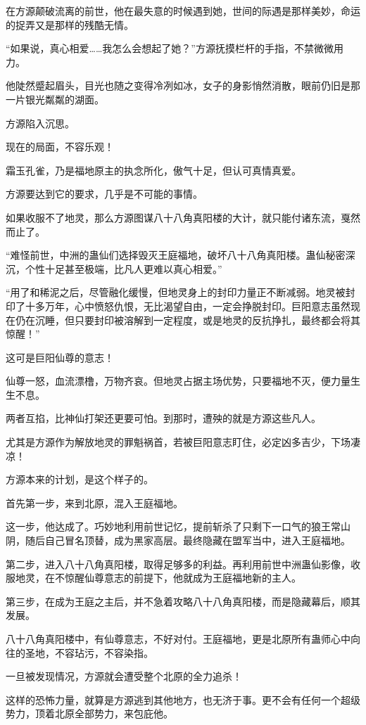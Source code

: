 \begin{this_body}
在方源颠破流离的前世，他在最失意的时候遇到她，世间的际遇是那样美妙，命运的捉弄又是那样的残酷无情。

“如果说，真心相爱……我怎么会想起了她？”方源抚摸栏杆的手指，不禁微微用力。

他陡然蹙起眉头，目光也随之变得冷冽如冰，女子的身影悄然消散，眼前仍旧是那一片银光粼粼的湖面。

方源陷入沉思。

现在的局面，不容乐观！

霜玉孔雀，乃是福地原主的执念所化，傲气十足，但认可真情真爱。

方源要达到它的要求，几乎是不可能的事情。

如果收服不了地灵，那么方源图谋八十八角真阳楼的大计，就只能付诸东流，戛然而止了。

“难怪前世，中洲的蛊仙们选择毁灭王庭福地，破坏八十八角真阳楼。蛊仙秘密深沉，个性十足甚至极端，比凡人更难以真心相爱。”

“用了和稀泥之后，尽管融化缓慢，但地灵身上的封印力量正不断减弱。地灵被封印了十多万年，心中愤怒仇恨，无比渴望自由，一定会挣脱封印。巨阳意志虽然现在仍在沉睡，但只要封印被溶解到一定程度，或是地灵的反抗挣扎，最终都会将其惊醒！”

这可是巨阳仙尊的意志！

仙尊一怒，血流漂橹，万物齐哀。但地灵占据主场优势，只要福地不灭，便力量生生不息。

两者互掐，比神仙打架还更要可怕。到那时，遭殃的就是方源这些凡人。

尤其是方源作为解放地灵的罪魁祸首，若被巨阳意志盯住，必定凶多吉少，下场凄凉！

方源本来的计划，是这个样子的。

首先第一步，来到北原，混入王庭福地。

这一步，他达成了。巧妙地利用前世记忆，提前斩杀了只剩下一口气的狼王常山阴，随后自己冒名顶替，成为黑家高层。最终隐藏在盟军当中，进入王庭福地。

第二步，进入八十八角真阳楼，取得足够多的利益。再利用前世中洲蛊仙影像，收服地灵，在不惊醒仙尊意志的前提下，他就成为王庭福地新的主人。

第三步，在成为王庭之主后，并不急着攻略八十八角真阳楼，而是隐藏幕后，顺其发展。

八十八角真阳楼中，有仙尊意志，不好对付。王庭福地，更是北原所有蛊师心中向往的圣地，不容玷污，不容染指。

一旦被发现情况，方源就会遭受整个北原的全力追杀！

这样的恐怖力量，就算是方源逃到其他地方，也无济于事。更不会有任何一个超级势力，顶着北原全部势力，来包庇他。


\end{this_body}
